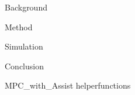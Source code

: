\documentclass{article}
\begin{document}
{Background}

{Method}

{Simulation}

{Conclusion}




\newpage
\doublespacing
\printbibliography[heading = bibintoc, title = References]    %

\singlespacing
\addappendix
{MPC_with_Assist}
{helperfunctions}


\end{document}
